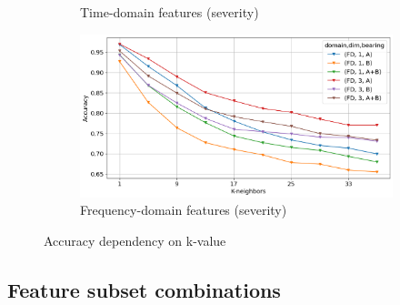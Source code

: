 \begin{figure}[h]
\begin{subfigure}[b]{0.48\textwidth}
        \caption{Time-domain features (severity)}
    \end{subfigure}
    \hfill
    \begin{subfigure}[b]{0.48\textwidth}
        \includegraphics[width=\textwidth]{assets/results/all-features/FD-severity.png}
        \caption{Frequency-domain features (severity)}
    \end{subfigure} 
    \caption{Accuracy dependency on k-value}
\end{figure}


\subsection{Feature subset combinations}





